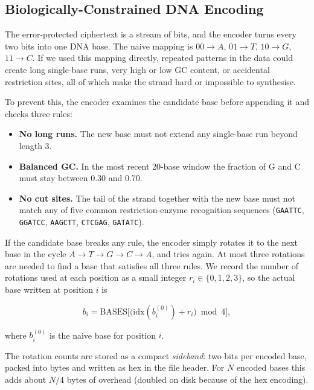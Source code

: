 \documentclass[conference]{IEEEtran}
\begin{document}
\subsection{Biologically-Constrained DNA Encoding}

The error-protected ciphertext is a stream of bits, and the encoder turns every two bits into one DNA base. The naive mapping is $00\!\to\!A$, $01\!\to\!T$, $10\!\to\!G$, $11\!\to\!C$. If we used this mapping directly, repeated patterns in the data could create long single-base runs, very high or low GC content, or accidental restriction sites, all of which make the strand hard or impossible to synthesise.

To prevent this, the encoder examines the candidate base before appending it and checks three rules:

\begin{itemize}
\item \textbf{No long runs.} The new base must not extend any single-base run beyond length 3.
\item \textbf{Balanced GC.} In the most recent 20-base window the fraction of G and C must stay between 0.30 and 0.70.
\item \textbf{No cut sites.} The tail of the strand together with the new base must not match any of five common restriction-enzyme recognition sequences (\texttt{GAATTC}, \texttt{GGATCC}, \texttt{AAGCTT}, \texttt{CTCGAG}, \texttt{GATATC}).
\end{itemize}

If the candidate base breaks any rule, the encoder simply rotates it to the next base in the cycle $A \to T \to G \to C \to A$, and tries again. At most three rotations are needed to find a base that satisfies all three rules. We record the number of rotations used at each position as a small integer $r_i \in \{0,1,2,3\}$, so the actual base written at position $i$ is

\begin{equation}
b_i = \text{BASES}\bigl[\bigl(\text{idx}(b_i^{(0)}) + r_i\bigr) \bmod 4\bigr],
\label{eq:rotation}
\end{equation}

\noindent where $b_i^{(0)}$ is the naive base for position $i$.

The rotation counts are stored as a compact \emph{sideband}: two bits per encoded base, packed into bytes and written as hex in the file header. For $N$ encoded bases this adds about $N/4$ bytes of overhead (doubled on disk because of the hex encoding).
\end{document}
